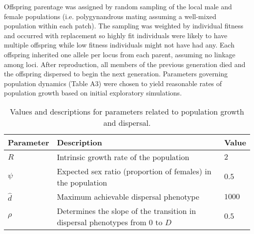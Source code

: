 \documentclass[11pt]{article}
\begin{document}
Offspring parentage was assigned by random sampling of the local male and female populations (i.e. polygynandrous mating assuming a well-mixed population within each patch). The sampling was weighted by individual fitness and occurred with replacement so highly fit individuals were likely to have multiple offspring while low fitness individuals might not have had any. Each offspring inherited one allele per locus from each parent, assuming no linkage among loci. After reproduction, all members of the previous generation died and the offspring dispersed to begin the next generation. Parameters governing population dynamics (Table A3) were chosen to yield reasonable rates of population growth based on initial exploratory simulations.

\begin{table}
\renewcommand{\arraystretch}{1.5}
  \begin{tabular}{ p{2cm} | p{8cm} | p{2cm} }
    \hline
    Parameter & Description & Value \\ \hline \hline
    $R$ & Intrinsic growth rate of the population & $2$ \\
    $\psi$ & Expected sex ratio (proportion of females) in the population & $0.5$ \\
    $\hat{d}$ & Maximum achievable dispersal phenotype & $1000$ \\
    $\rho$ & Determines the slope of the transition in dispersal phenotypes from $0$ to $D$ & $0.5$ \\
    \hline
  \end{tabular}
\caption[LoF entry]{Values and descriptions for parameters related to population growth and dispersal.}
\label{table:PopPars}
\end{table}
\end{document}
